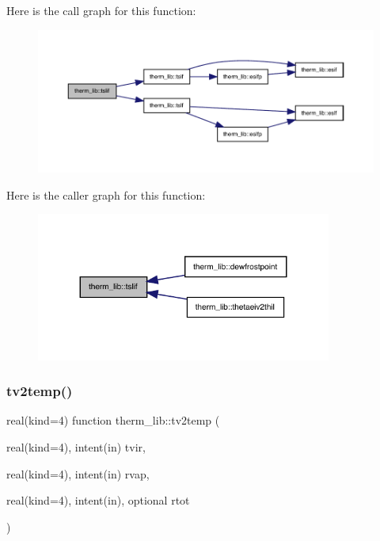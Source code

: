 Here is the call graph for this function\+:
\nopagebreak
\begin{figure}[H]
\begin{center}
\leavevmode
\includegraphics[width=350pt]{namespacetherm__lib_a7448671da269afe05b39189c581f790b_cgraph}
\end{center}
\end{figure}
Here is the caller graph for this function\+:
\nopagebreak
\begin{figure}[H]
\begin{center}
\leavevmode
\includegraphics[width=275pt]{namespacetherm__lib_a7448671da269afe05b39189c581f790b_icgraph}
\end{center}
\end{figure}
\mbox{\label{namespacetherm__lib_a0ac9a85555ff45eb6d4de4ca94045eb8}} 
\subsubsection{\texorpdfstring{tv2temp()}{tv2temp()}}
{\footnotesize\ttfamily real(kind=4) function therm\+\_\+lib\+::tv2temp (\begin{DoxyParamCaption}\item[{real(kind=4), intent(in)}]{tvir,  }\item[{real(kind=4), intent(in)}]{rvap,  }\item[{real(kind=4), intent(in), optional}]{rtot }\end{DoxyParamCaption})}


